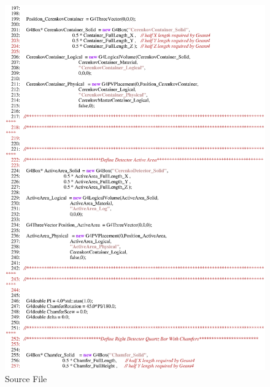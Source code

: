 \begin{figure}[ht]
  \hspace{0cm}
  \includegraphics[scale=0.8]{./figures5/QweakSimCerenkovDetector.cc-p4.eps}
  \caption{\label{SourceV4} Source File}
           \label{fig:V-SC-8}
\end{figure}
\clearpage

